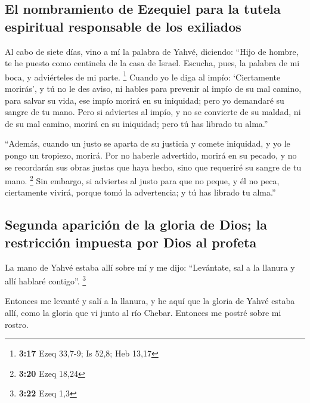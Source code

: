 \hypertarget{el-nombramiento-de-ezequiel-para-la-tutela-espiritual-responsable-de-los-exiliados}{%
\subsection{El nombramiento de Ezequiel para la tutela espiritual
responsable de los
exiliados}\label{el-nombramiento-de-ezequiel-para-la-tutela-espiritual-responsable-de-los-exiliados}}

 Al cabo de siete días, vino a mí la palabra de Yahvé,
diciendo:  ``Hijo de hombre, te he puesto como centinela
de la casa de Israel. Escucha, pues, la palabra de mi boca, y
adviérteles de mi parte. \footnote{\textbf{3:17} Ezeq 33,7-9; Is 52,8;
  Heb 13,17}  Cuando yo le diga al impío: `Ciertamente
morirás', y tú no le des aviso, ni hables para prevenir al impío de su
mal camino, para salvar su vida, ese impío morirá en su iniquidad; pero
yo demandaré su sangre de tu mano.  Pero si adviertes al
impío, y no se convierte de su maldad, ni de su mal camino, morirá en su
iniquidad; pero tú has librado tu alma.''

 ``Además, cuando un justo se aparta de su justicia y
comete iniquidad, y yo le pongo un tropiezo, morirá. Por no haberle
advertido, morirá en su pecado, y no se recordarán sus obras justas que
haya hecho, sino que requeriré su sangre de tu mano. \footnote{\textbf{3:20}
  Ezeq 18,24}  Sin embargo, si adviertes al justo para
que no peque, y él no peca, ciertamente vivirá, porque tomó la
advertencia; y tú has librado tu alma.''

\hypertarget{segunda-apariciuxf3n-de-la-gloria-de-dios-la-restricciuxf3n-impuesta-por-dios-al-profeta}{%
\subsection{Segunda aparición de la gloria de Dios; la restricción
impuesta por Dios al
profeta}\label{segunda-apariciuxf3n-de-la-gloria-de-dios-la-restricciuxf3n-impuesta-por-dios-al-profeta}}

 La mano de Yahvé estaba allí sobre mí y me dijo:
``Levántate, sal a la llanura y allí hablaré contigo''. \footnote{\textbf{3:22}
  Ezeq 1,3}

 Entonces me levanté y salí a la llanura, y he aquí que
la gloria de Yahvé estaba allí, como la gloria que vi junto al río
Chebar. Entonces me postré sobre mi rostro.

